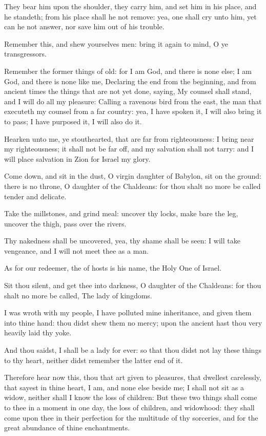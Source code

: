 \Verse They bear him upon the shoulder, they carry him, and set him in his place, and he standeth; from his place shall he not remove: yea, one shall cry unto him, yet can he not answer, nor save him out of his trouble.

\Verse Remember this, and shew yourselves men: bring it again to mind, O ye transgressors.

\Verse Remember the former things of old: for I am God, and there is none else; I am God, and there is none like me, \Verse Declaring the end from the beginning, and from ancient times the things that are not yet done, saying, My counsel shall stand, and I will do all my pleasure: \Verse Calling a ravenous bird from the east, the man that executeth my counsel from a far country: yea, I have spoken it, I will also bring it to pass; I have purposed it, I will also do it.

\Verse Hearken unto me, ye stouthearted, that are far from righteousness: \Verse I bring near my righteousness; it shall not be far off, and my salvation shall not tarry: and I will place salvation in Zion for Israel my glory.


\Chapter
\Verse Come down, and sit in the dust, O virgin daughter of Babylon, sit on the ground: there is no throne, O daughter of the Chaldeans: for thou shalt no more be called tender and delicate.

\Verse Take the millstones, and grind meal: uncover thy locks, make bare the leg, uncover the thigh, pass over the rivers.

\Verse Thy nakedness shall be uncovered, yea, thy shame shall be seen: I will take vengeance, and I will not meet thee as a man.

\Verse As for our redeemer, the \LORD of hosts is his name, the Holy One of Israel.

\Verse Sit thou silent, and get thee into darkness, O daughter of the Chaldeans: for thou shalt no more be called, The lady of kingdoms.

\Verse I was wroth with my people, I have polluted mine inheritance, and given them into thine hand: thou didst shew them no mercy; upon the ancient hast thou very heavily laid thy yoke.

\Verse And thou saidst, I shall be a lady for ever: so that thou didst not lay these things to thy heart, neither didst remember the latter end of it.

\Verse Therefore hear now this, thou that art given to pleasures, that dwellest carelessly, that sayest in thine heart, I am, and none else beside me; I shall not sit as a widow, neither shall I know the loss of children: \Verse But these two things shall come to thee in a moment in one day, the loss of children, and widowhood: they shall come upon thee in their perfection for the multitude of thy sorceries, and for the great abundance of thine enchantments.

